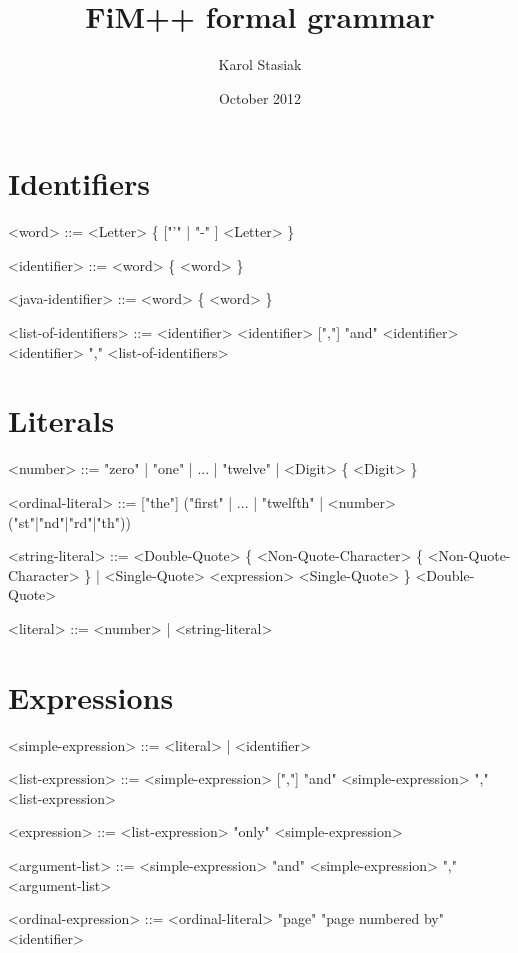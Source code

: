 \documentclass[12pt,a4paper]{article}
\title{FiM++ formal grammar}
\author{Karol Stasiak}
\date{October 2012}
\begin{document}
\section{Identifiers}

\begin{grammar}
<word> ::= <Letter> \{ ["'"  | "-" ] <Letter>  \} 

<identifier> ::= <word> \{ <word> \}

<java-identifier> ::= <word> \{ <word> \}

<list-of-identifiers> ::= <identifier> \alt <identifier> [","] "and" <identifier> \alt <identifier> "," <list-of-identifiers>
\end{grammar}

\section{Literals}

\begin{grammar}

<number> ::= "zero" | "one" | ... | "twelve" | <Digit> \{ <Digit> \}

<ordinal-literal> ::= ["the"] ("first" | ... | "twelfth" | <number> ("st"|"nd"|"rd"|"th"))

<string-literal> ::= <Double-Quote> \{ <Non-Quote-Character> \{ <Non-Quote-Character> \} | <Single-Quote> <expression> <Single-Quote> \} <Double-Quote>

<literal> ::= <number> | <string-literal>
\end{grammar}

\section{Expressions}

\begin{grammar}

<simple-expression> ::= <literal> | <identifier>

<list-expression> ::= <simple-expression> [","] "and" <simple-expression>  "," <list-expression>

<expression> ::= <list-expression> \alt "only" <simple-expression> 

<argument-list> ::= <simple-expression>  "and" <simple-expression>  "," <argument-list>

<ordinal-expression> ::= <ordinal-literal> "page" \alt "page numbered by" <identifier>

\end{grammar}
\end{document}
